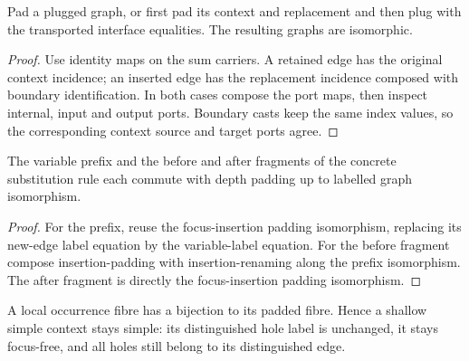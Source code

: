 


\begin{lemma}
Pad a plugged graph, or first pad its context and replacement and then plug with the transported interface equalities. The resulting graphs are isomorphic.
\end{lemma}

\begin{proof}
Use identity maps on the sum carriers. A retained edge has the original context incidence; an inserted edge has the replacement incidence composed with boundary identification. In both cases compose the port maps, then inspect internal, input and output ports. Boundary casts keep the same index values, so the corresponding context source and target ports agree.
\end{proof}



\begin{lemma}
The variable prefix and the before and after fragments of the concrete substitution rule each commute with depth padding up to labelled graph isomorphism.
\end{lemma}

\begin{proof}
For the prefix, reuse the focus-insertion padding isomorphism, replacing its new-edge label equation by the variable-label equation. For the before fragment compose insertion-padding with insertion-renaming along the prefix isomorphism. The after fragment is directly the focus-insertion padding isomorphism.
\end{proof}





\begin{lemma}
A local occurrence fibre has a bijection to its padded fibre. Hence a shallow simple context stays simple: its distinguished hole label is unchanged, it stays focus-free, and all holes still belong to its distinguished edge.
\end{lemma}

